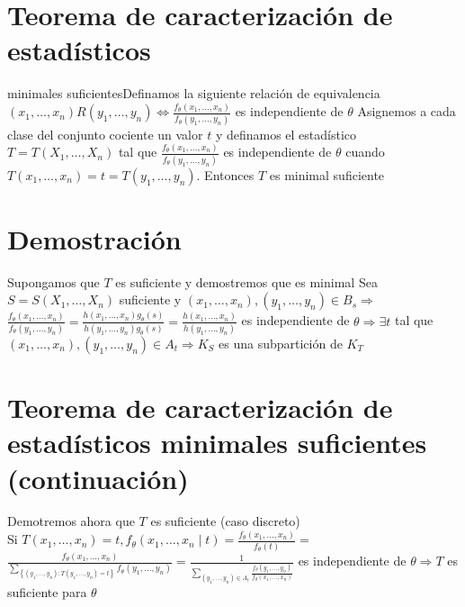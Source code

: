   \section*{Teorema de caracterización de estadísticos}
  minimales suficientesDefinamos la siguiente relación de equivalencia $\left(x_{1}, \ldots, x_{n}\right) R\left(y_{1}, \ldots, y_{n}\right) \Leftrightarrow \frac{f_{\theta}\left(x_{1}, \ldots, x_{n}\right)}{f_{\theta}\left(y_{1}, \ldots, y_{n}\right)}$ es independiente de $\theta$ Asignemos a cada clase del conjunto cociente un valor $t$ y definamos el estadístico $T=T\left(X_{1}, \ldots, X_{n}\right)$ tal que $\frac{f_{\theta}\left(x_{1}, \ldots, x_{n}\right)}{f_{\theta}\left(y_{1}, \ldots, y_{n}\right)}$ es independiente de $\theta$ cuando $T\left(x_{1}, \ldots, x_{n}\right)=t=T\left(y_{1}, \ldots, y_{n}\right)$. Entonces $T$ es minimal suficiente
  
  \section*{Demostración}
  Supongamos que $T$ es suficiente y demostremos que es minimal Sea $S=S\left(X_{1}, \ldots, X_{n}\right)$ suficiente y $\left(x_{1}, \ldots, x_{n}\right),\left(y_{1}, \ldots, y_{n}\right) \in B_{s} \Rightarrow$ $\frac{f_{\theta}\left(x_{1}, \ldots, x_{n}\right)}{f_{\theta}\left(y_{1}, \ldots, y_{n}\right)}=\frac{h\left(x_{1}, \ldots, x_{n}\right) g_{\theta}(s)}{h\left(y_{1}, \ldots, y_{n}\right) g_{\theta}(s)}=\frac{h\left(x_{1}, \ldots, x_{n}\right)}{h\left(y_{1}, \ldots, y_{n}\right)}$ es independiente de $\theta \Rightarrow \exists t$ tal que $\left(x_{1}, \ldots, x_{n}\right),\left(y_{1}, \ldots, y_{n}\right) \in A_{t} \Rightarrow K_{S}$ es una subpartición de $K_{T}$
  
  \section*{Teorema de caracterización de estadísticos minimales suficientes (continuación)}
  Demotremos ahora que $T$ es suficiente (caso discreto)\\
  Si $T\left(x_{1}, \ldots, x_{n}\right)=t, f_{\theta}\left(x_{1}, \ldots, x_{n} \mid t\right)=\frac{f_{\theta}\left(x_{1}, \ldots, x_{n}\right)}{f_{\theta}(t)}=$\\
  $\frac{f_{\theta}\left(x_{1}, \ldots, x_{n}\right)}{\sum_{\left\{\left(y_{1}, \ldots, y_{n}\right): T\left(y_{1}, \ldots, y_{n}\right)=t\right\}} f_{\theta}\left(y_{1}, \ldots, y_{n}\right)}=\frac{1}{\sum_{\left(y_{1}, \ldots, y_{n}\right) \in A_{t}} \frac{f_{\theta}\left(y_{1}, \ldots, y_{n}\right)}{f_{\theta}\left(x_{1}, \ldots, x_{n}\right)}}$ es independiente de $\theta \Rightarrow T$ es suficiente para $\theta$
  
